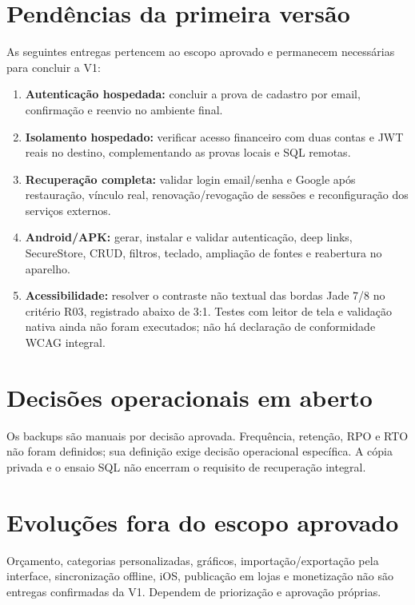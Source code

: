 \documentclass[
    12pt,
    oneside,
    a4paper,
    brazil
]{abntex2}
\begin{document}
\section{Pendências da primeira versão}

As seguintes entregas pertencem ao escopo aprovado e permanecem necessárias para concluir a V1:
\begin{enumerate}[leftmargin=*, itemsep=0.25em]
\item \textbf{Autenticação hospedada:} concluir a prova de cadastro por email, confirmação e reenvio no ambiente final.
\item \textbf{Isolamento hospedado:} verificar acesso financeiro com duas contas e JWT reais no destino, complementando as provas locais e SQL remotas.
\item \textbf{Recuperação completa:} validar login email/senha e Google após restauração, vínculo real, renovação/revogação de sessões e reconfiguração dos serviços externos.
\item \textbf{Android/APK:} gerar, instalar e validar autenticação, deep links, SecureStore, CRUD, filtros, teclado, ampliação de fontes e reabertura no aparelho.
\item \textbf{Acessibilidade:} resolver o contraste não textual das bordas Jade 7/8 no critério R03, registrado abaixo de 3:1. Testes com leitor de tela e validação nativa ainda não foram executados; não há declaração de conformidade WCAG integral.
\end{enumerate}

\section{Decisões operacionais em aberto}

Os backups são manuais por decisão aprovada. Frequência, retenção, RPO e RTO não foram definidos; sua definição exige decisão operacional específica. A cópia privada e o ensaio SQL não encerram o requisito de recuperação integral.

\section{Evoluções fora do escopo aprovado}

Orçamento, categorias personalizadas, gráficos, importação/exportação pela interface, sincronização offline, iOS, publicação em lojas e monetização não são entregas confirmadas da V1. Dependem de priorização e aprovação próprias.
\end{document}
